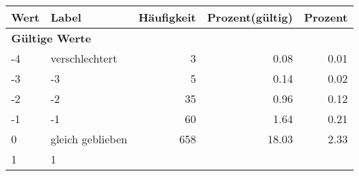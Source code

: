      \begin{longtable}{lXrrr}
     \toprule
     \textbf{Wert} & \textbf{Label} & \textbf{Häufigkeit} & \textbf{Prozent(gültig)} & \textbf{Prozent} \\
     \endhead
     \midrule
     \multicolumn{5}{l}{\textbf{Gültige Werte}}\\

     -4 &
     \multicolumn{1}{X}{ verschlechtert   } &


       \num{3} &
       \num[round-mode=places,round-precision=2]{0.08} &
         \num[round-mode=places,round-precision=2]{0.01} \\

     -3 &
     \multicolumn{1}{X}{ -3   } &


       \num{5} &
       \num[round-mode=places,round-precision=2]{0.14} &
         \num[round-mode=places,round-precision=2]{0.02} \\

     -2 &
     \multicolumn{1}{X}{ -2   } &


       \num{35} &
       \num[round-mode=places,round-precision=2]{0.96} &
         \num[round-mode=places,round-precision=2]{0.12} \\

     -1 &
     \multicolumn{1}{X}{ -1   } &


       \num{60} &
       \num[round-mode=places,round-precision=2]{1.64} &
         \num[round-mode=places,round-precision=2]{0.21} \\

     0 &
     \multicolumn{1}{X}{ gleich geblieben   } &


       \num{658} &
       \num[round-mode=places,round-precision=2]{18.03} &
         \num[round-mode=places,round-precision=2]{2.33} \\

     1 &
     \multicolumn{1}{X}{ 1   } &



\end{longtable}
